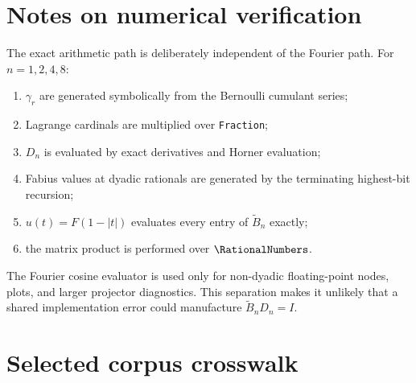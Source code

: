\documentclass[11pt,oneside]{article}
\numberwithin{equation}{section}
\theoremstyle{definition}
\theoremstyle{remark}
\begin{document}
\section{Notes on numerical verification}
\label{app:numerical-notes}

The exact arithmetic path is deliberately independent of the Fourier path.
For $n=1,2,4,8$:
\begin{enumerate}
\item $\gamma_r$ are generated symbolically from the Bernoulli cumulant
series;
\item Lagrange cardinals are multiplied over \texttt{Fraction};
\item $D_n$ is evaluated by exact derivatives and Horner evaluation;
\item Fabius values at dyadic rationals are generated by the terminating
highest-bit recursion;
\item $u(t)=F(1-|t|)$ evaluates every entry of $\widetilde B_n$ exactly;
\item the matrix product is performed over $\RationalNumbers$.
\end{enumerate}
The Fourier cosine evaluator is used only for non-dyadic floating-point
nodes, plots, and larger projector diagnostics.  This separation makes it
unlikely that a shared implementation error could manufacture
$\widetilde B_nD_n=I$.

\section{Selected corpus crosswalk}
\label{app:crosswalk}
\end{document}

